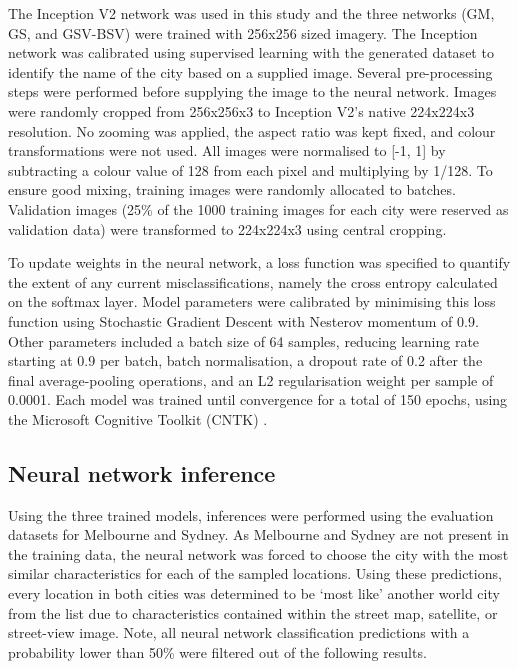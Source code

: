 \documentclass[Crown,sageh,times]{sagej}
\begin{document}
The Inception V2 network was used in this study and the three networks (GM, GS, and GSV-BSV) were trained with 256x256 sized imagery. The Inception network was calibrated using supervised learning with the generated dataset to identify the name of the city based on a supplied image. Several pre-processing steps were performed before supplying the image to the neural network. Images were randomly cropped from 256x256x3 to Inception V2's native 224x224x3 resolution. No zooming was applied, the aspect ratio was kept fixed, and colour transformations were not used. All images were normalised to [-1, 1] by subtracting a colour value of 128 from each pixel and multiplying by 1/128. To ensure good mixing, training images were randomly allocated to batches. Validation images (25\% of the 1000 training images for each city were reserved as validation data) were transformed to 224x224x3 using central cropping.


To update weights in the neural network, a loss function was specified to quantify the extent of any current misclassifications, namely the cross entropy calculated on the softmax layer. Model parameters were calibrated by minimising this loss function using Stochastic Gradient Descent with Nesterov momentum of 0.9. Other parameters included a batch size of 64 samples, reducing learning rate starting at 0.9 per batch, batch normalisation, a dropout rate of 0.2 after the final average-pooling operations, and an L2 regularisation weight per sample of 0.0001. Each model was trained until convergence for a total of 150 epochs, using the Microsoft Cognitive Toolkit (CNTK) \citep{Yu2015}. 


\subsection{Neural network inference}\label{sec:methods5}    
Using the three trained models, inferences were performed using the evaluation datasets for Melbourne and Sydney. As Melbourne and Sydney are not present in the training data, the neural network was forced to choose the city with the most similar characteristics for each of the sampled locations. Using these predictions, every location in both cities was determined to be `most like' another world city from the list due to  characteristics contained within the street map, satellite, or street-view image. Note, all neural network classification predictions with a probability lower than 50\% were filtered out of the following results.
\end{document}
